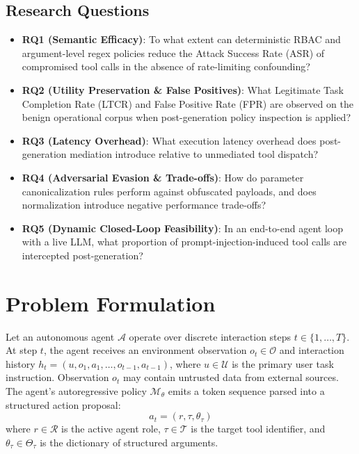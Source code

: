 \documentclass[10pt,twocolumn,letterpaper]{article}
\begin{document}
\subsection{Research Questions}
\begin{itemize}
    \item \textbf{RQ1 (Semantic Efficacy)}: To what extent can deterministic RBAC and argument-level regex policies reduce the Attack Success Rate (ASR) of compromised tool calls in the absence of rate-limiting confounding?
    \item \textbf{RQ2 (Utility Preservation \& False Positives)}: What Legitimate Task Completion Rate (LTCR) and False Positive Rate (FPR) are observed on the benign operational corpus when post-generation policy inspection is applied?
    \item \textbf{RQ3 (Latency Overhead)}: What execution latency overhead does post-generation mediation introduce relative to unmediated tool dispatch?
    \item \textbf{RQ4 (Adversarial Evasion \& Trade-offs)}: How do parameter canonicalization rules perform against obfuscated payloads, and does normalization introduce negative performance trade-offs?
    \item \textbf{RQ5 (Dynamic Closed-Loop Feasibility)}: In an end-to-end agent loop with a live LLM, what proportion of prompt-injection-induced tool calls are intercepted post-generation?
\end{itemize}

\section{Problem Formulation}
Let an autonomous agent $\mathcal{A}$ operate over discrete interaction steps $t \in \{1, \dots, T\}$. At step $t$, the agent receives an environment observation $o_t \in \mathcal{O}$ and interaction history $h_t = (u, o_1, a_1, \dots, o_{t-1}, a_{t-1})$, where $u \in \mathcal{U}$ is the primary user task instruction. Observation $o_t$ may contain untrusted data from external sources. The agent's autoregressive policy $\mathcal{M}_\theta$ emits a token sequence parsed into a structured action proposal:
\begin{equation}
a_t = (r, \tau, \theta_\tau)
\end{equation}
where $r \in \mathcal{R}$ is the active agent role, $\tau \in \mathcal{T}$ is the target tool identifier, and $\theta_\tau \in \Theta_\tau$ is the dictionary of structured arguments.
\end{document}
